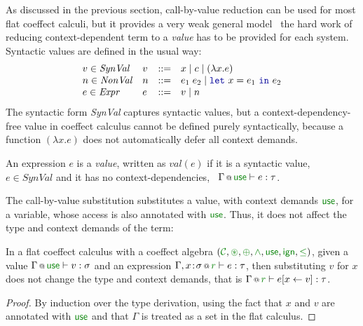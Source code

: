 As discussed in the previous section, call-by-value reduction can be used for most flat coeffect
calculi, but it provides a very weak general model \ie~the hard work of reducing context-dependent
term to a \emph{value} has to be provided for each system. Syntactic values are defined
in the usual way:
%
\begin{equation*}
\begin{array}{llll}
v\in\mathit{SynVal}   & v &::=& x \sep c \sep (\lambda x.e)\\
n\in\mathit{NonVal}   & n &::=& e_1\;e_2 \sep \kvd{let}~x=e_1~\kvd{in}~e_2\\
e\in\mathit{Expr}     & e &::=& v \sep n
\end{array}
\end{equation*}
%
The syntactic form \emph{SynVal} captures syntactic values, but a context-dependency-free value in
coeffect calculus cannot be defined purely syntactically, because a function $(\lambda x.e)$ does
not automatically defer all context demands.

\begin{definition}
An expression $e$ is a \emph{value}, written as $\textit{val}(e)$ if it is a syntactic value,
\ie~$e \in \mathit{SynVal}$ and it has no context-dependencies, \ie~$\coctx{\Gamma}{ \cunit } \vdash e : \tau$.
\end{definition}

\noindent
The call-by-value substitution substitutes a value, with context demands $\cunit$, for a
variable, whose access is also annotated with $\cunit$. Thus, it does not affect the type and
context demands of the term:

\begin{lemma}
\label{thm:flat-subst-cbv}
In a flat coeffect calculus with a coeffect algebra $(\C, \cseq, \cpar, \czip, \cunit, \czero, \cleq)$,
given a value $\coctx{\Gamma}{\cunit} \vdash v : \sigma$ and an expression
$\coctx{\Gamma,  x\!:\!\sigma}{ \cclrd{r}  } \vdash e : \tau$, then substituting $v$ for $x$ does not
change the type and context demands, that is $\coctx{\Gamma}{ \cclrd{r} } \vdash \subst{e}{x}{v} : \tau$.
\end{lemma}
\begin{proof}
By induction over the type derivation, using the fact that $x$ and $v$ are annotated
with $\cunit$ and that $\Gamma$ is treated as a set in the flat calculus.
\end{proof}

